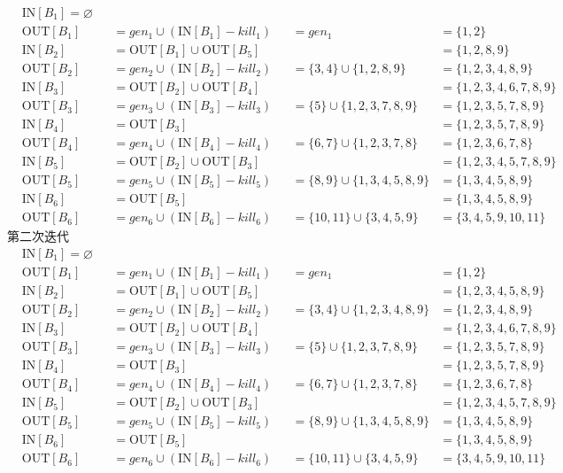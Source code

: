 \documentclass{article}
\begin{document}
\begin{align*}
   & \text{IN}[B_1] = \varnothing &&&&&\\
   & \text{OUT}[B_1] &&= gen_1 \cup (\text{IN}[B_1] - kill_1) &&= gen_1 &= \{1,2\} \\
   & \text{IN}[B_2] &&= \text{OUT}[B_1] \cup \text{OUT}[B_5] &&&= \{1,2,8,9\}\\
   & \text{OUT}[B_2] &&= gen_2 \cup (\text{IN}[B_2] - kill_2) &&= \{3,4\} \cup \{1,2,8,9\} &= \{1,2,3,4,8,9\} \\
   & \text{IN}[B_3] &&= \text{OUT}[B_2] \cup \text{OUT}[B_4] &&&= \{1,2,3,4,6,7,8,9\}\\
   & \text{OUT}[B_3] &&= gen_3 \cup (\text{IN}[B_3] - kill_3) &&= \{5\} \cup \{1,2,3,7,8,9\} &= \{1,2,3,5,7,8,9\} \\
   & \text{IN}[B_4] &&= \text{OUT}[B_3] &&&= \{1,2,3,5,7,8,9\}\\
   & \text{OUT}[B_4] &&= gen_4 \cup (\text{IN}[B_4] - kill_4) &&= \{6,7\} \cup \{1,2,3,7,8\} &= \{1,2,3,6,7,8\} \\
   & \text{IN}[B_5] &&= \text{OUT}[B_2] \cup \text{OUT}[B_3] &&&= \{1,2,3,4,5,7,8,9\}\\
   & \text{OUT}[B_5] &&= gen_5 \cup (\text{IN}[B_5] - kill_5) &&= \{8,9\} \cup \{1,3,4,5,8,9\} &= \{1,3,4,5,8,9\} \\
   & \text{IN}[B_6] &&= \text{OUT}[B_5] &&&= \{1,3,4,5,8,9\}\\
   & \text{OUT}[B_6] &&= gen_6 \cup (\text{IN}[B_6] - kill_6) &&= \{10,11\} \cup \{3,4,5,9\} &= \{3,4,5,9,10,11\}
\end{align*}
第二次迭代
\begin{align*}
    & \text{IN}[B_1] = \varnothing &&&&&\\
    & \text{OUT}[B_1] &&= gen_1 \cup (\text{IN}[B_1] - kill_1) &&= gen_1 &= \{1,2\} \\
    & \text{IN}[B_2] &&= \text{OUT}[B_1] \cup \text{OUT}[B_5] &&&= \{1,2,3,4,5,8,9\} \\
    & \text{OUT}[B_2] &&= gen_2 \cup (\text{IN}[B_2] - kill_2) &&= \{3,4\} \cup \{1,2,3,4,8,9\} &= \{1,2,3,4,8,9\} \\
    & \text{IN}[B_3] &&= \text{OUT}[B_2] \cup \text{OUT}[B_4] &&&= \{1,2,3,4,6,7,8,9\} \\
    & \text{OUT}[B_3] &&= gen_3 \cup (\text{IN}[B_3] - kill_3) &&= \{5\} \cup \{1,2,3,7,8,9\} &= \{1,2,3,5,7,8,9\} \\
    & \text{IN}[B_4] &&= \text{OUT}[B_3] &&&= \{1,2,3,5,7,8,9\} \\
    & \text{OUT}[B_4] &&= gen_4 \cup (\text{IN}[B_4] - kill_4) &&= \{6,7\} \cup \{1,2,3,7,8\} &= \{1,2,3,6,7,8\} \\
    & \text{IN}[B_5] &&= \text{OUT}[B_2] \cup \text{OUT}[B_3] &&&= \{1,2,3,4,5,7,8,9\} \\
    & \text{OUT}[B_5] &&= gen_5 \cup (\text{IN}[B_5] - kill_5) &&= \{8,9\} \cup \{1,3,4,5,8,9\} &= \{1,3,4,5,8,9\} \\
    & \text{IN}[B_6] &&= \text{OUT}[B_5] &&&= \{1,3,4,5,8,9\} \\
    & \text{OUT}[B_6] &&= gen_6 \cup (\text{IN}[B_6] - kill_6) &&= \{10,11\} \cup \{3,4,5,9\} &= \{3,4,5,9,10,11\}
\end{align*}
\end{document}
